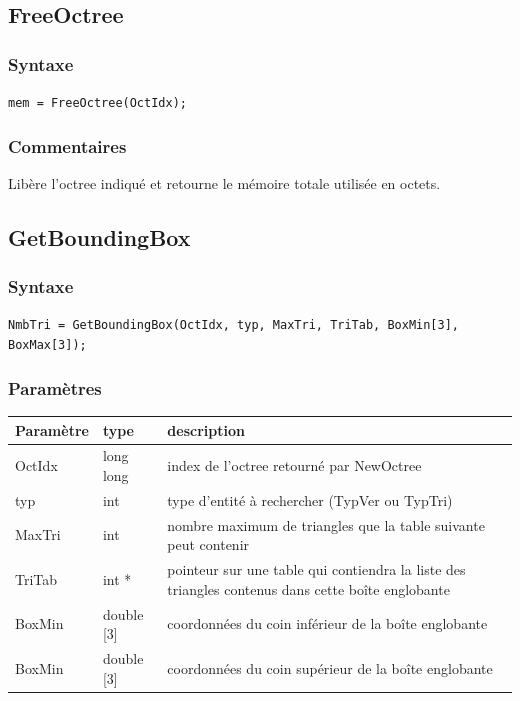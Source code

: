 \documentclass[a4paper,12pt]{article}
\begin{document}
\subsection{FreeOctree}

\subsubsection*{Syntaxe}
{\tt mem = FreeOctree(OctIdx);}

\subsubsection*{Commentaires}
Libère l'octree indiqué et retourne le mémoire totale utilisée en octets.



\subsection{GetBoundingBox}
\subsubsection*{Syntaxe}
{\tt NmbTri = GetBoundingBox(OctIdx, typ, MaxTri, TriTab, BoxMin[3], BoxMax[3]);}
\subsubsection*{Paramètres}

\begin{tabular}{|m{3cm}|m{2cm}|m{8.5cm}|}
\hline
Paramètre  & type      & description \\
\hline
OctIdx     & long long & index de l'octree retourné par NewOctree \\
\hline
typ        & int       & type d'entité à rechercher (TypVer ou TypTri) \\
\hline
MaxTri     & int       & nombre maximum de triangles que la table suivante peut contenir \\
\hline
TriTab     & int *     & pointeur sur une table qui contiendra la liste des triangles contenus dans cette boîte englobante \\
\hline
BoxMin     & double [3] & coordonnées du coin inférieur de la boîte englobante \\
\hline
BoxMin     & double [3] & coordonnées du coin supérieur de la boîte englobante \\
\hline
\end{tabular}

\medskip
\end{document}
